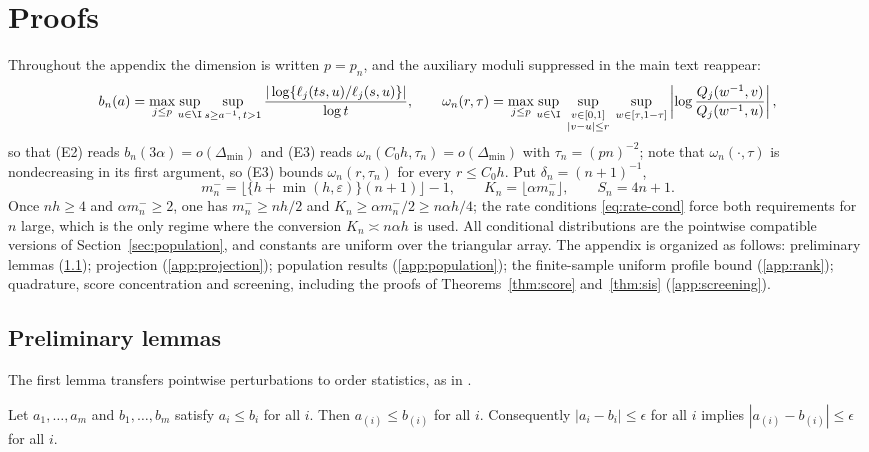 \section{Proofs}
\label{app:proofs}
\renewcommand{\theequation}{A.\arabic{equation}}
\setcounter{equation}{0}

Throughout the appendix the dimension is written $p=p_n$, and the auxiliary
moduli suppressed in the main text reappear:
\[
 b_n(a)=\max_{j\le p}\sup_{u\in\I}\sup_{s\ge a^{-1},\,t>1}
 \frac{|\log\{\ell_j(ts,u)/\ell_j(s,u)\}|}{\log t},
 \qquad
 \omega_n(r,\tau)=\max_{j\le p}
 \sup_{u\in\I}\;
 \sup_{\substack{v\in[0,1]\\|v-u|\le r}}\;
 \sup_{w\in[\tau,1-\tau]}
 \left|\log\frac{Q_j(w^{-1},v)}{Q_j(w^{-1},u)}\right|,
\]
so that (E2) reads $b_n(3\alpha)=o(\Delta_{\min})$ and (E3) reads
$\omega_n(C_0h,\tau_n)=o(\Delta_{\min})$ with $\tau_n=(pn)^{-2}$; note
that $\omega_n(\cdot,\tau)$ is nondecreasing in its first argument, so
(E3) bounds $\omega_n(r,\tau_n)$ for every $r\le C_0h$.  Put
$\delta_n=(n+1)^{-1}$,
\[
 m_n^-=\bigl\lfloor\{h+\min(h,\varepsilon)\}(n+1)\bigr\rfloor-1,
 \qquad
 K_n=\lfloor\alpha m_n^-\rfloor,
 \qquad
 S_n=4n+1.
\]
Once $nh\ge4$ and $\alpha m_n^-\ge2$, one has $m_n^-\ge nh/2$ and
$K_n\ge\alpha m_n^-/2\ge n\alpha h/4$; the rate conditions
\eqref{eq:rate-cond} force both requirements for $n$ large, which is the
only regime where the conversion $K_n\asymp n\alpha h$ is used.  All
conditional distributions are the pointwise compatible versions of
Section~\ref{sec:population}, and constants are uniform over the triangular
array.  The appendix is organized as follows: preliminary lemmas
(\ref{app:prelim}); projection (\ref{app:projection}); population results
(\ref{app:population}); the finite-sample uniform profile bound
(\ref{app:rank}); quadrature, score concentration and screening, including
the proofs of Theorems~\ref{thm:score} and~\ref{thm:sis}
(\ref{app:screening}).

\subsection{Preliminary lemmas}\label{app:prelim}

The first lemma transfers pointwise perturbations to order statistics, as in
\citet[Appendix, Lemma~3]{gardesPodgorny2025}.

\begin{lemma}\label{lem:app-sorting}
Let $a_1,\ldots,a_m$ and $b_1,\ldots,b_m$ satisfy $a_i\le b_i$ for all $i$.
Then $a_{(i)}\le b_{(i)}$ for all $i$.  Consequently
$|a_i-b_i|\le\epsilon$ for all $i$ implies
$|a_{(i)}-b_{(i)}|\le\epsilon$ for all $i$.
\end{lemma}

